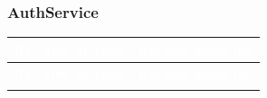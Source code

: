 \documentclass[a4paper]{article}
\begin{document}
\subsubsection{AuthService}

\begin{longtable}{|C{0.8cm}|L{5.4cm}|L{7.4cm}|}
\hline
{}
\textcolor{white}{\textbf{ID}} &
\textcolor{white}{\textbf{Test Method}} &
\textcolor{white}{\textbf{Kết quả mong đợi}} \\
\hline
\endfirsthead
\hline
{}
\textcolor{white}{\textbf{ID}} &
\textcolor{white}{\textbf{Test Method}} &
\textcolor{white}{\textbf{Kết quả mong đợi}} \\
\hline
\endhead
\hline
\endfoot


\end{longtable}
\end{document}

